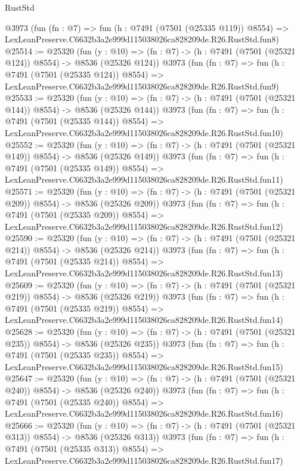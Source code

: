 \begin{lexlean}{RustStd}
\begin{coremodule}
    @3973
    (fun (fn : @7) =>
    fun (h : @7491 (@7501 (@25335 @119)) @8554) =>
    LexLeanPreserve.C6632b3a2e999d115038026ca828209de.R26.RustStd.fun8)
@25514 := @25320
    (fun (y : @10) => (fn : @7) -> (h : @7491 (@7501 (@25321 @124)) @8554) -> @8536 (@25326 @124))
    @3973
    (fun (fn : @7) =>
    fun (h : @7491 (@7501 (@25335 @124)) @8554) =>
    LexLeanPreserve.C6632b3a2e999d115038026ca828209de.R26.RustStd.fun9)
@25533 := @25320
    (fun (y : @10) => (fn : @7) -> (h : @7491 (@7501 (@25321 @144)) @8554) -> @8536 (@25326 @144))
    @3973
    (fun (fn : @7) =>
    fun (h : @7491 (@7501 (@25335 @144)) @8554) =>
    LexLeanPreserve.C6632b3a2e999d115038026ca828209de.R26.RustStd.fun10)
@25552 := @25320
    (fun (y : @10) => (fn : @7) -> (h : @7491 (@7501 (@25321 @149)) @8554) -> @8536 (@25326 @149))
    @3973
    (fun (fn : @7) =>
    fun (h : @7491 (@7501 (@25335 @149)) @8554) =>
    LexLeanPreserve.C6632b3a2e999d115038026ca828209de.R26.RustStd.fun11)
@25571 := @25320
    (fun (y : @10) => (fn : @7) -> (h : @7491 (@7501 (@25321 @209)) @8554) -> @8536 (@25326 @209))
    @3973
    (fun (fn : @7) =>
    fun (h : @7491 (@7501 (@25335 @209)) @8554) =>
    LexLeanPreserve.C6632b3a2e999d115038026ca828209de.R26.RustStd.fun12)
@25590 := @25320
    (fun (y : @10) => (fn : @7) -> (h : @7491 (@7501 (@25321 @214)) @8554) -> @8536 (@25326 @214))
    @3973
    (fun (fn : @7) =>
    fun (h : @7491 (@7501 (@25335 @214)) @8554) =>
    LexLeanPreserve.C6632b3a2e999d115038026ca828209de.R26.RustStd.fun13)
@25609 := @25320
    (fun (y : @10) => (fn : @7) -> (h : @7491 (@7501 (@25321 @219)) @8554) -> @8536 (@25326 @219))
    @3973
    (fun (fn : @7) =>
    fun (h : @7491 (@7501 (@25335 @219)) @8554) =>
    LexLeanPreserve.C6632b3a2e999d115038026ca828209de.R26.RustStd.fun14)
@25628 := @25320
    (fun (y : @10) => (fn : @7) -> (h : @7491 (@7501 (@25321 @235)) @8554) -> @8536 (@25326 @235))
    @3973
    (fun (fn : @7) =>
    fun (h : @7491 (@7501 (@25335 @235)) @8554) =>
    LexLeanPreserve.C6632b3a2e999d115038026ca828209de.R26.RustStd.fun15)
@25647 := @25320
    (fun (y : @10) => (fn : @7) -> (h : @7491 (@7501 (@25321 @240)) @8554) -> @8536 (@25326 @240))
    @3973
    (fun (fn : @7) =>
    fun (h : @7491 (@7501 (@25335 @240)) @8554) =>
    LexLeanPreserve.C6632b3a2e999d115038026ca828209de.R26.RustStd.fun16)
@25666 := @25320
    (fun (y : @10) => (fn : @7) -> (h : @7491 (@7501 (@25321 @313)) @8554) -> @8536 (@25326 @313))
    @3973
    (fun (fn : @7) =>
    fun (h : @7491 (@7501 (@25335 @313)) @8554) =>
    LexLeanPreserve.C6632b3a2e999d115038026ca828209de.R26.RustStd.fun17)

\end{coremodule}
\end{lexlean}
